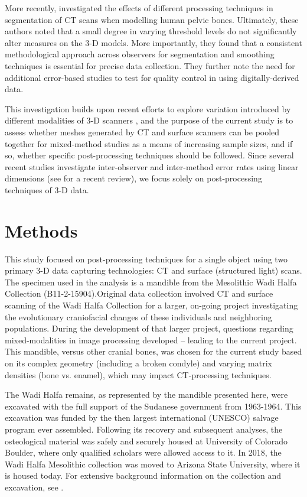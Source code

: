 \documentclass[review]{elsarticle}
\begin{document}
More recently, \citet{RN8984} investigated the effects of different processing techniques in segmentation of CT scans when modelling human pelvic bones. Ultimately, these authors noted that a small degree in varying threshold levels do not significantly alter measures on the 3-D models. More importantly, they found that a consistent methodological approach across observers for segmentation and smoothing techniques is essential for precise data collection. They further note the need for additional error-based studies to test for quality control in using digitally-derived data.

This investigation builds upon recent efforts to explore variation introduced by different modalities of 3-D scanners \citep{RN11522}, and the purpose of the current study is to assess whether meshes generated by CT and surface scanners can be pooled together for mixed-method studies as a means of increasing sample sizes, and if so, whether specific post-processing techniques should be followed. Since several recent studies investigate inter-observer and inter-method error rates using linear dimensions (see \citealt{RN11945} for a recent review), we focus solely on post-processing techniques of 3-D data. 

\section{Methods}

This study focused on post-processing techniques for a single object using two primary 3-D data capturing technologies: CT and surface (structured light) scans. The specimen used in the analysis is a mandible from the Mesolithic Wadi Halfa Collection  (B11-2-15904).Original data collection involved CT and surface scanning of the Wadi Halfa Collection for a larger, on-going project investigating the evolutionary craniofacial changes of these individuals and neighboring populations. During the development of that larger project, questions regarding mixed-modalities in image processing developed -- leading to the current project. This  mandible, versus other cranial bones, was chosen for the current study based on its complex geometry (including a broken condyle) and varying matrix densities (bone vs. enamel), which may impact CT-processing techniques.

The Wadi Halfa remains, as represented by the mandible presented here, were excavated with the full support of the Sudanese government from 1963-1964. This excavation was funded by the then largest international (UNESCO) salvage program ever assembled. Following its recovery and subsequent analyses, the osteological material was safely and securely housed at University of Colorado Boulder, where only qualified scholars were allowed access to it. In 2018, the Wadi Halfa Mesolithic collection was moved to Arizona State University, where it is housed today. For extensive background information on the collection and excavation, see \citet{wadi}.  
\end{document}
